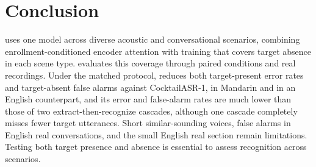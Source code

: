 \section{Conclusion}
\label{sec:conclusion}
\model uses one model across diverse acoustic and conversational scenarios, combining enrollment-conditioned encoder attention with training that covers target absence in each scene type.
\bench evaluates this coverage through paired conditions and real recordings.
Under the matched protocol, \model reduces both target-present error rates and target-absent false alarms against CocktailASR-1, in Mandarin and in an English counterpart, and its error and false-alarm rates are much lower than those of two extract-then-recognize cascades, although one cascade completely misses fewer target utterances.
Short similar-sounding voices, false alarms in English real conversations, and the small English real section remain limitations.
Testing both target presence and absence is essential to assess recognition across scenarios.
